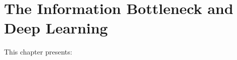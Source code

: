 

\chapter{The Information Bottleneck and Deep Learning}\label{ch:ib_and_dl}


This chapter presents:

